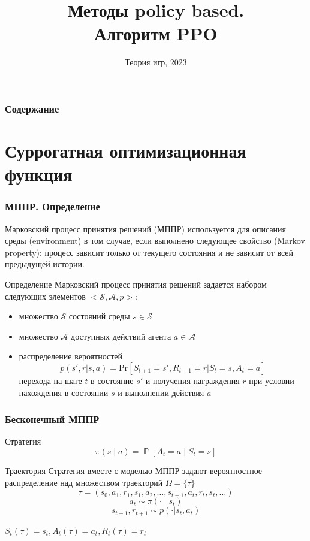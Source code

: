 \documentclass[notheorems]{beamer} %
\title[Обучение с подкреплением] %
{Методы policy  based. \\
Алгоритм PPO}
\date[Теория игр] %
{Теория игр,  2023}
\begin{document}
\frame{\titlepage}


\begin{frame}
\frametitle{Содержание}%
\tableofcontents
\end{frame}
\section{Суррогатная оптимизационная функция}
\begin{frame}
	\frametitle{МППР. Определение}
	Марковский процесс принятия решений (МППР) используется для описания среды (environment)  в том случае, если выполнено следующее свойство (Markov property): процесс зависит только от текущего состояния и не зависит от всей предыдущей истории.
	
	\begin{block}{ Определение}
		Марковский процесс принятия решений задается набором следующих элементов $<\mathcal{S}, \mathcal{A}, p>$:
		\begin{itemize}
			\item множество  $\mathcal{S}$  состояний среды $s \in \mathcal{S}$
			\item множество $\mathcal{A}$ доступных действий агента $a \in \mathcal{A}$
			\item распределение вероятностей
			$$p(s',r|s,a)=\text{Pr}[S_{t+1}=s', R_{t+1}=r|S_t=s, A_t=a ]$$ перехода на шаге $t$  в состояние $s'$ и получения награждения  $r$ при условии нахождения в состоянии $s$ и выполнении действия $a$ 
		\end{itemize}
	\end{block}
\end{frame}
\begin{frame}
	\frametitle{Бесконечный МППР}
	\begin{block}{Стратегия}
		$$\pi ( s \mid a) = \mathop{\mathbb{P}}[A_t=a \mid S_t=s] $$
	\end{block}
	\begin{block}{Траектория}
		Стратегия вместе с моделью МППР задают вероятностное распределение над множеством траекторий $\Omega=\{\tau\}$
		$$\tau = (s_0, a_1, r_1, s_1, a_2, \dots, s_{t-1}, a_{t}, r_{t}, s_t, \dots)$$
		$$a_t \sim \pi(\cdot \mid s_t)$$ $$s_{t+1},r_{t+1} \sim p(\cdot|s_t, a_t)$$
	\end{block}
	
	$S_t(\tau) = s_t, A_t(\tau) = a_t,R_t(\tau) = r_t$
	

	
\end{frame}
\end{document}
